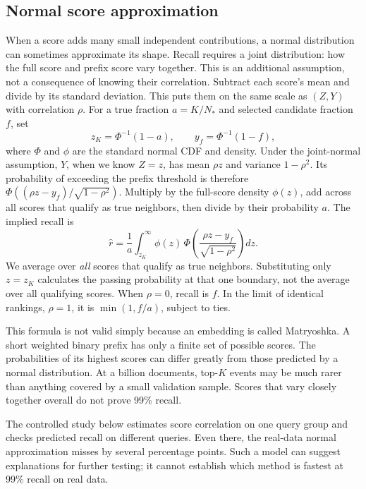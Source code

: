 \subsection{Normal score approximation}
When a score adds many small independent contributions, a normal distribution can sometimes
approximate its shape. Recall requires a joint distribution: how the full score and prefix score
vary together. This is an additional assumption, not a consequence of knowing their correlation. Subtract each score's mean and divide by its standard deviation. This puts them on the same scale as $(Z,Y)$ with correlation $\rho$. For a true
fraction $a=K/N_*$ and selected candidate fraction $f$, set
\[
z_K=\Phi^{-1}(1-a),\qquad y_f=\Phi^{-1}(1-f),
\]
where $\Phi$ and $\phi$ are the standard normal CDF and density. Under the joint-normal assumption, $Y$, when we know $Z=z$, has mean $\rho z$ and variance
$1-\rho^2$. Its probability of exceeding the prefix threshold is therefore
$\Phi((\rho z-y_f)/\sqrt{1-\rho^2})$. Multiply by the full-score density $\phi(z)$,
add across all scores that qualify as true neighbors, then divide by their probability $a$. The implied recall is
\begin{equation}
\widehat r=
\frac{1}{a}\int_{z_K}^{\infty}
\phi(z)\,\Phi\!\left(\frac{\rho z-y_f}{\sqrt{1-\rho^2}}\right)dz.
\label{eq:normal-recall}
\end{equation}
We average over \emph{all} scores that qualify as true neighbors. Substituting only $z=z_K$ calculates the passing probability at that one boundary,
not the average over all qualifying scores. When $\rho=0$, recall is $f$. In the limit of
identical rankings, $\rho=1$, it is $\min(1,f/a)$, subject to ties.

This formula is not valid simply because an embedding is called Matryoshka. A short weighted
binary prefix has only a finite set of possible scores. The probabilities of its highest scores can differ greatly
from those predicted by a normal distribution. At a billion documents, top-$K$ events may be much rarer than
anything covered by a small validation sample. Scores that vary closely together overall do not prove 99\% recall.

The controlled study below estimates score correlation on one query group and checks predicted
recall on different queries. Even there, the real-data normal approximation misses by several
percentage points. Such a model can suggest explanations for further testing; it cannot establish which method
is fastest at 99\% recall on real data.

